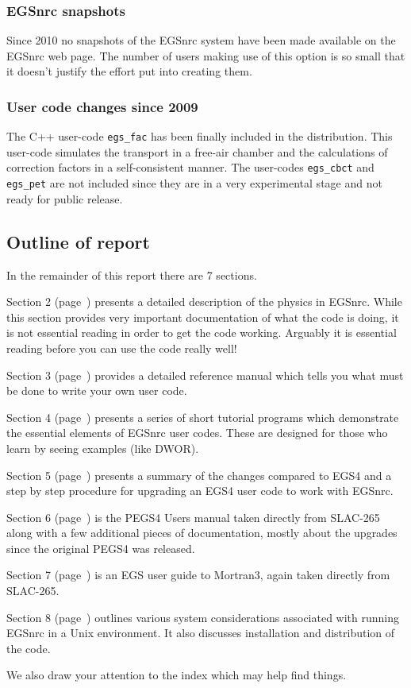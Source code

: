 \subsubsection{ EGSnrc snapshots }

Since 2010 no snapshots of the EGSnrc system have been made 
available on the EGSnrc web page. The number of users making use
of this option is so small that it doesn't justify the effort put 
into creating them.

\subsubsection{User code changes since 2009}

The C++ user-code {\tt egs\_fac} has been finally included in the
distribution. This user-code simulates the transport in a 
free-air chamber and the calculations of correction factors
in a self-consistent manner. The user-codes {\tt egs\_cbct} 
and {\tt egs\_pet} are not included since they are in a very
experimental stage and not ready for public release.

\subsection{Outline of report}

In the remainder of this report there are 7 sections.  

Section 2 (page~\pageref{section_2}) presents a detailed description
of the physics in EGSnrc. While this section provides very important
documentation of what the code is doing, it is not essential reading in
order to get the code working.  Arguably it is essential reading before
you can use the code really well!

Section 3 (page~\pageref{ERM}) provides a detailed reference manual
which tells you what must be done to write your own user code.

Section 4 (page~\pageref{tutorials}) presents a series of short tutorial
programs which demonstrate the essential elements of EGSnrc user codes.
These are designed for those who learn by seeing examples (like DWOR).

Section 5 (page~\pageref{changes}) presents a summary of the changes
compared to EGS4 and a step by step procedure for upgrading an EGS4 user
code to work with EGSnrc.

Section 6 (page~\pageref{pegs4}) is the PEGS4 Users manual taken directly
from SLAC-265 along with a few additional pieces of documentation,
mostly about the upgrades since the original PEGS4 was released.

Section 7 (page~\pageref{UGM3}) is an EGS user guide to Mortran3, again
taken directly from SLAC-265.

Section 8 (page~\pageref{sys_consid}) outlines various system
considerations associated with running EGSnrc in a Unix environment. It
also discusses installation and distribution of the code.

We also draw your attention to the index which may help  find things.
